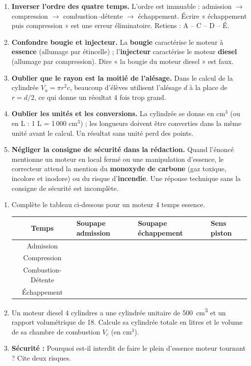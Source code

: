 \documentclass[11pt]{article}
\begin{document}
\begin{attention}
\begin{enumerate}
\item \textbf{Inverser l'ordre des quatre temps.} L'ordre est immuable : admission $\rightarrow$ compression $\rightarrow$ combustion--détente $\rightarrow$ échappement. Écrire « échappement puis compression » est une erreur éliminatoire. Retiens : A -- C -- D -- É.
\item \textbf{Confondre bougie et injecteur.} La \textbf{bougie} caractérise le moteur à \textbf{essence} (allumage par étincelle) ; l'\textbf{injecteur} caractérise le moteur \textbf{diesel} (allumage par compression). Dire « la bougie du moteur diesel » est faux.
\item \textbf{Oublier que le rayon est la moitié de l'alésage.} Dans le calcul de la cylindrée $V_u = \pi r^2 c$, beaucoup d'élèves utilisent l'alésage $d$ à la place de $r = d/2$, ce qui donne un résultat 4 fois trop grand.
\item \textbf{Oublier les unités et les conversions.} La cylindrée se donne en cm$^3$ (ou en L : 1 L = 1\,000 cm$^3$) ; les longueurs doivent être converties dans la même unité avant le calcul. Un résultat sans unité perd des points.
\item \textbf{Négliger la consigne de sécurité dans la rédaction.} Quand l'énoncé mentionne un moteur en local fermé ou une manipulation d'essence, le correcteur attend la mention du \textbf{monoxyde de carbone } (gaz toxique, incolore et inodore) ou du risque d'\textbf{incendie}. Une réponse technique sans la consigne de sécurité est incomplète.
\end{enumerate}
\end{attention}

\begin{exercice}
\begin{enumerate}
\item Complète le tableau ci-dessous pour un moteur 4 temps essence.
\begin{center}
\begin{tabularx}{\linewidth}{|c|X|X|X|}\hline
\rowcolor{popblueL}
\textbf{Temps} & \textbf{Soupape admission} & \textbf{Soupape échappement} & \textbf{Sens piston} \\ \hline
Admission & & & \\ \hline
Compression & & & \\ \hline
Combustion-Détente & & & \\ \hline
Échappement & & & \\ \hline
\end{tabularx}
\end{center}
\item Un moteur diesel 4 cylindres a une cylindrée unitaire de \SI{500}{cm^3} et un rapport volumétrique de 18. Calcule sa cylindrée totale en litres et le volume de sa chambre de combustion $V_c$ (en cm$^3$).
\item \textbf{Sécurité :} Pourquoi est-il interdit de faire le plein d'essence moteur tournant ? Cite deux risques.
\end{enumerate}
\end{exercice}
\end{document}
